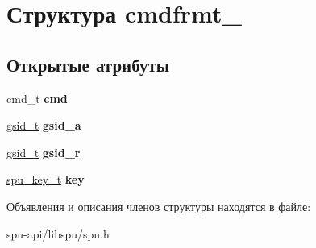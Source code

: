 \hypertarget{structcmdfrmt__5}{}\section{Структура cmdfrmt\+\_}
\label{structcmdfrmt__5}
\subsection*{Открытые атрибуты}
\begin{DoxyCompactItemize}
\item 
\mbox{\label{structcmdfrmt__5_a17a209fc4545ae5aa00b689908404b3a}} 
cmd\+\_\+t {\bfseries cmd}
\item 
\mbox{\label{structcmdfrmt__5_ab0b1416c71a9704c51e50cee4ed1dfc5}} 
\hyperlink{structgsid__container}{gsid\+\_\+t} {\bfseries gsid\+\_\+a}
\item 
\mbox{\label{structcmdfrmt__5_a62cf21f14c394db9374079c4c3bf53bc}} 
\hyperlink{structgsid__container}{gsid\+\_\+t} {\bfseries gsid\+\_\+r}
\item 
\mbox{\label{structcmdfrmt__5_ab18c2569f26e66b4fba96b71b49f02db}} 
\hyperlink{structdata__container}{spu\+\_\+key\+\_\+t} {\bfseries key}
\end{DoxyCompactItemize}


Объявления и описания членов структуры находятся в файле\+:\begin{DoxyCompactItemize}
\item 
spu-\/api/libspu/spu.\+h\end{DoxyCompactItemize}
